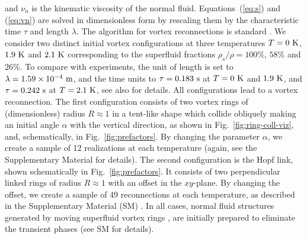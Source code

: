 \documentclass[%
 reprint,
 amsmath,amssymb,
 aps,
 prl,
]{revtex4-2}
\begin{document}
and $\nu_n$ is the kinematic viscosity of the normal fluid. 
Equations~(\ref{eq:s}) and (\ref{eq:vn})
are solved in dimensionless form by rescaling them by the characteristic time $\tau$ and length $\lambda$. 
The algorithm for vortex reconnections is standard
\cite{baggaleySensitivityVortexFilament2012a}. We consider two distinct initial vortex configurations
at three temperatures $T=0~\rm K$, $1.9~\rm K$ and $2.1~\rm K$
corresponding to the superfluid fractions $\rho_s/\rho=100 \%$,
$58 \%$ and $26 \%$. To compare with experiments, the unit of length is set to $\lambda=1.59 \times 10^{-4}~\rm m$, and the time units to $\tau=0.183~\rm s$ at $T=0~\rm K$ and $1.9~\rm K$, and $\tau=0.242~\rm s$ at $T=2.1~\rm K$, see also \cite{SeeSupplementaryMaterials} for details.
%
All configurations lead to a vortex reconnection.
The first configuration consists of two vortex rings 
of (dimensionless) radius $R\approx 1$ in a tent-like shape
which collide obliquely 
making an initial angle $\alpha$ with the vertical direction, 
as shown in Fig.~\ref{fig:ring-coll-viz}, and,
schematically, in Fig.~\ref{fig:prefactors}.   
By changing the parameter $\alpha$, we create a sample of 12 realizations
at each temperature (again, see the Supplementary Material 
\cite{SeeSupplementaryMaterials} for details).
The second configuration is the Hopf link, shown schematically in Fig.~\ref{fig:prefactors}. It consists of two perpendicular linked rings of radius $R\approx1$ with an offset in the $xy$-plane.
By changing the offset, we create a sample of 49 reconnections
at each temperature, as described in the Supplementary Material (SM)
\cite{SeeSupplementaryMaterials}.
In all cases, normal fluid structures generated by moving superfluid vortex rings \cite{kivotides-barenghi-samuels-2000}, are initially prepared to eliminate the transient phases (see SM for details).
\end{document}
